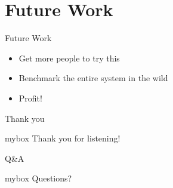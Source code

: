 \documentclass[10pt,aspectratio=43,table,fontset=none]{beamer}
\begin{document}
\section{Future Work}
\begin{frame}{Future Work}  %
\begin{itemize}
\item<0-> Get more people to try this
\item<0-> Benchmark the entire system in the wild
\item<0-> Profit!
\end{itemize}
\end{frame}

\begin{frame}{Thank you}
\begin{center}
\begin{minipage}{1\textwidth}
 \begin{beamercolorbox}[wd=0.70\textwidth, rounded=true, shadow=true]{mybox}
\LARGE \centering Thank you for listening!  %
\end{beamercolorbox}
 \end{minipage}
\end{center}
\end{frame}

\begin{frame}{Q\&A}
\begin{center}
	\begin{minipage}{1\textwidth}
		\begin{beamercolorbox}[wd=0.70\textwidth, rounded=true, shadow=true]{mybox}
			\LARGE \centering  Questions?  %
		\end{beamercolorbox}
	\end{minipage}
\end{center}
\end{frame}

\end{document}
